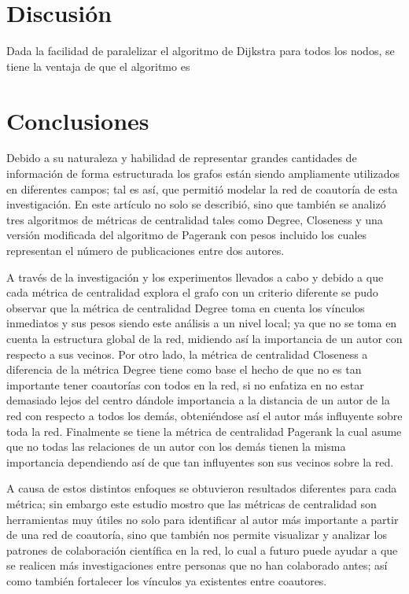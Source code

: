 \documentclass[journal]{IEEEtran}
\begin{document}
\section{Discusión}

Dada la facilidad de paralelizar el algoritmo de Dijkstra para todos los nodos, se tiene la ventaja de que el algoritmo es

\section{Conclusiones}

Debido a su naturaleza y habilidad de representar grandes cantidades de información de forma estructurada los grafos están siendo ampliamente utilizados en diferentes campos; tal es así, que permitió modelar la red de coautoría de esta investigación. En este artículo no solo se describió, sino que también se analizó tres algoritmos de métricas de centralidad tales como Degree, Closeness y una versión modificada del algoritmo de Pagerank con pesos incluido los cuales representan el número de publicaciones entre dos autores.

A través de la investigación y los experimentos llevados a cabo y debido a que cada métrica de centralidad explora el grafo con un criterio diferente se pudo observar que la métrica de centralidad Degree toma en cuenta los vínculos inmediatos y sus pesos siendo este análisis a un nivel local; ya que no se toma en cuenta la estructura global de la red, midiendo así la importancia de un autor con respecto a sus vecinos. Por otro lado, la métrica de centralidad Closeness a diferencia de la métrica Degree tiene como base el hecho de que no es tan importante tener coautorías con todos en la red, si no enfatiza en no estar demasiado lejos del centro dándole importancia a la distancia de un autor de la red con respecto a todos los demás, obteniéndose así el autor más influyente sobre toda la red. Finalmente se tiene la métrica de centralidad Pagerank la cual asume que no todas las relaciones de un autor con los demás tienen la misma importancia dependiendo así de que tan influyentes son sus vecinos sobre la red.

A causa de estos distintos enfoques se obtuvieron resultados diferentes para cada métrica; sin embargo este estudio mostro que las métricas de centralidad son herramientas muy útiles no solo para identificar al autor más importante a partir de una red de coautoría, sino que también nos permite visualizar y analizar los patrones de colaboración científica en la red, lo cual a futuro puede ayudar a que se realicen más investigaciones entre personas que no han colaborado antes; así como también fortalecer los vínculos ya existentes entre coautores.
\end{document}
